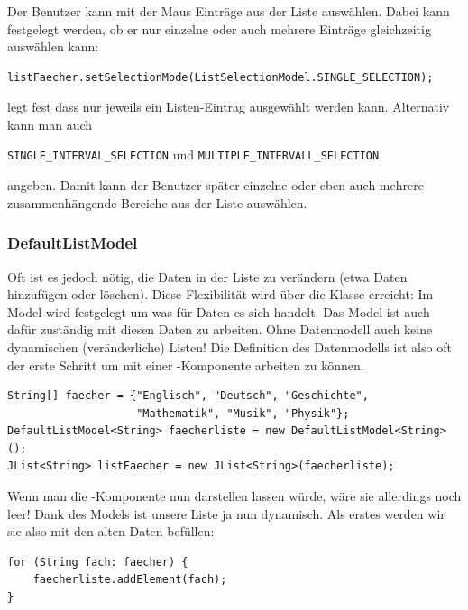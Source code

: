 \subsubsection{}

Der Benutzer kann mit der Maus Einträge aus der Liste auswählen. Dabei kann
festgelegt werden, ob er nur einzelne oder auch mehrere Einträge gleichzeitig
auswählen kann:

\begin{lstlisting}
listFaecher.setSelectionMode(ListSelectionModel.SINGLE_SELECTION);
\end{lstlisting}

legt fest dass nur jeweils ein Listen-Eintrag ausgewählt werden kann. Alternativ
kann man auch

\lstinline|SINGLE_INTERVAL_SELECTION| und
\lstinline|MULTIPLE_INTERVALL_SELECTION|

angeben. Damit kann der Benutzer später einzelne oder eben auch mehrere
zusammenhängende Bereiche aus der Liste auswählen.

\subsubsection{DefaultListModel}

Oft ist es jedoch nötig, die Daten in der Liste zu verändern (etwa Daten
hinzufügen oder löschen). Diese Flexibilität wird über die Klasse
 erreicht: Im Model wird festgelegt um was für Daten
es sich handelt. Das Model ist auch dafür zuständig mit diesen Daten zu
arbeiten. Ohne Datenmodell auch keine dynamischen (veränderliche) Listen! Die
Definition des Datenmodells ist also oft der erste Schritt um mit einer
-Komponente arbeiten zu können.

\begin{lstlisting}
String[] faecher = {"Englisch", "Deutsch", "Geschichte", 
                    "Mathematik", "Musik", "Physik"};
DefaultListModel<String> faecherliste = new DefaultListModel<String>();
JList<String> listFaecher = new JList<String>(faecherliste);
\end{lstlisting}

Wenn man die -Komponente nun darstellen lassen würde, wäre sie
allerdings noch leer! Dank des Models ist unsere Liste ja nun dynamisch. Als
erstes werden wir sie also mit den alten Daten befüllen:

\begin{lstlisting}
for (String fach: faecher) {
    faecherliste.addElement(fach);
}
\end{lstlisting}

